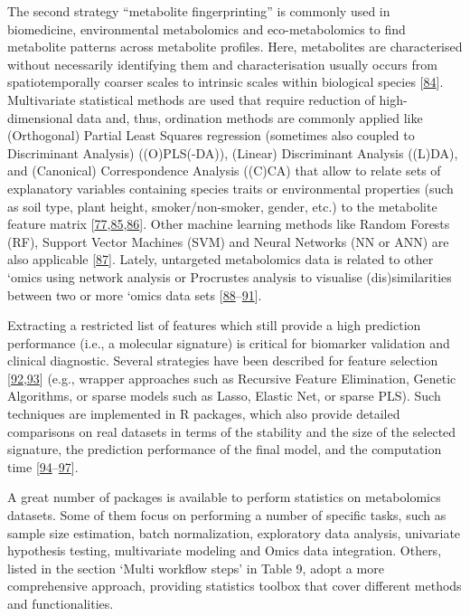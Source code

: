 \documentclass[]{article}
\begin{document}
The second strategy ``metabolite fingerprinting'' is commonly used in biomedicine, environmental metabolomics and eco-metabolomics to find metabolite patterns across metabolite profiles. Here, metabolites are characterised without necessarily identifying them and characterisation usually occurs from spatiotemporally coarser scales to intrinsic scales within biological species {[}\protect\hyperlink{ref-peters_2018}{84}{]}. Multivariate statistical methods are used that require reduction of high-dimensional data and, thus, ordination methods are commonly applied like (Orthogonal) Partial Least Squares regression (sometimes also coupled to Discriminant Analysis) ((O)PLS(-DA)), (Linear) Discriminant Analysis ((L)DA), and (Canonical) Correspondence Analysis ((C)CA) that allow to relate sets of explanatory variables containing species traits or environmental properties (such as soil type, plant height, smoker/non-smoker, gender, etc.) to the metabolite feature matrix {[}\protect\hyperlink{ref-shaw_2003}{77},\protect\hyperlink{ref-gromski_2014}{85},\protect\hyperlink{ref-legendre_2012}{86}{]}. Other machine learning methods like Random Forests (RF), Support Vector Machines (SVM) and Neural Networks (NN or ANN) are also applicable {[}\protect\hyperlink{ref-clarke_2009}{87}{]}. Lately, untargeted metabolomics data is related to other `omics using network analysis or Procrustes analysis to visualise (dis)similarities between two or more `omics data sets {[}\protect\hyperlink{ref-feng_2018}{88}--\protect\hyperlink{ref-wei_2018}{91}{]}.

Extracting a restricted list of features which still provide a high prediction performance (i.e., a molecular signature) is critical for biomarker validation and clinical diagnostic. Several strategies have been described for feature selection {[}\protect\hyperlink{ref-degenhardt_2019}{92},\protect\hyperlink{ref-saeys_2007}{93}{]} (e.g., wrapper approaches such as Recursive Feature Elimination, Genetic Algorithms, or sparse models such as Lasso, Elastic Net, or sparse PLS). Such techniques are implemented in R packages, which also provide detailed comparisons on real datasets in terms of the stability and the size of the selected signature, the prediction performance of the final model, and the computation time {[}\protect\hyperlink{ref-determanjr_2014}{94}--\protect\hyperlink{ref-wehrens_2012}{97}{]}.

A great number of packages is available to perform statistics on metabolomics datasets. Some of them focus on performing a number of specific tasks, such as sample size estimation, batch normalization, exploratory data analysis, univariate hypothesis testing, multivariate modeling and Omics data integration. Others, listed in the section `Multi workflow steps' in Table 9, adopt a more comprehensive approach, providing statistics toolbox that cover different methods and functionalities.
\end{document}
